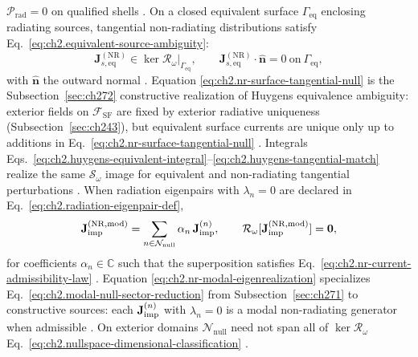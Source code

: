 \(\mathcal{P}_{\mathrm{rad}}=0\) on qualified shells \cite{harrington2001}.
On a closed equivalent surface \(\Gamma_{\mathrm{eq}}\) enclosing radiating sources, tangential
non-radiating distributions satisfy Eq.~\eqref{eq:ch2.equivalent-source-ambiguity}:
\begin{equation}
\label{eq:ch2.nr-surface-tangential-null}
\mathbf{J}_{s,\mathrm{eq}}^{\mathrm{(NR)}}
\in
\ker\mathcal{R}_\omega\big|_{\Gamma_{\mathrm{eq}}},
\qquad
\mathbf{J}_{s,\mathrm{eq}}^{\mathrm{(NR)}}\cdot\hat{\mathbf{n}}=0
\ \text{on}\ \Gamma_{\mathrm{eq}},
\end{equation}
with \(\hat{\mathbf{n}}\) the outward normal \cite{stratton1941}. Equation
\eqref{eq:ch2.nr-surface-tangential-null} is the Subsection~\ref{sec:ch272} constructive realization of
Huygens equivalence ambiguity: exterior fields on \(\mathcal{F}_{\mathrm{SF}}\) are fixed by
exterior radiative uniqueness (Subsection~\ref{sec:ch243}), but equivalent surface currents are unique
only up to additions in Eq.~\eqref{eq:ch2.nr-surface-tangential-null}
\cite{stratton1941}. Integrals Eqs.~\eqref{eq:ch2.huygens-equivalent-integral}--\eqref{eq:ch2.huygens-tangential-match}
realize the same \(\mathcal{S}_\omega\) image for equivalent and non-radiating tangential
perturbations \cite{harrington2001}.
When radiation eigenpairs with \(\lambda_n=0\) are declared in
Eq.~\eqref{eq:ch2.radiation-eigenpair-def},
\begin{equation}
\label{eq:ch2.nr-modal-eigenrealization}
\mathbf{J}_{\mathrm{imp}}^{\mathrm{(NR,mod)}}
=
\sum_{n\in\mathcal{N}_{\mathrm{null}}}
\alpha_n\,\mathbf{J}_{\mathrm{imp}}^{(n)},
\qquad
\mathcal{R}_\omega[\mathbf{J}_{\mathrm{imp}}^{\mathrm{(NR,mod)}}]=\mathbf{0},
\end{equation}
for coefficients \(\alpha_n\in\mathbb{C}\) such that the superposition satisfies
Eq.~\eqref{eq:ch2.nr-current-admissibility-law} \cite{stratton1941}. Equation
\eqref{eq:ch2.nr-modal-eigenrealization} specializes Eq.~\eqref{eq:ch2.modal-null-sector-reduction}
from Subsection~\ref{sec:ch271} to constructive sources: each \(\mathbf{J}_{\mathrm{imp}}^{(n)}\) with
\(\lambda_n=0\) is a modal non-radiating generator when admissible
\cite{stratton1941}. On exterior domains \(\mathcal{N}_{\mathrm{null}}\) need not span all of
\(\ker\mathcal{R}_\omega\) Eq.~\eqref{eq:ch2.nullspace-dimensional-classification}
\cite{harrington2001}.
